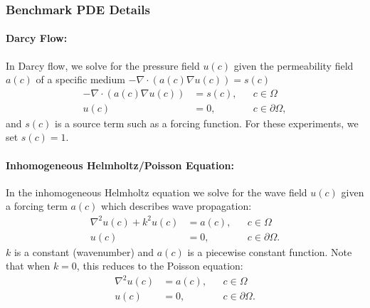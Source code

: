 \subsubsection{Benchmark PDE Details} \label{app:pde_details}

\paragraph{Darcy Flow: }
In Darcy flow, we solve for the pressure field $u(c)$ given the permeability field $a(c)$ of a specific medium $-\nabla \cdot (a(c)\nabla u(c)) = s(c)$ 
\begin{equation}
\begin{aligned}
 -\nabla \cdot (a(c)\nabla u(c)) &= s(c), &&c \in \Omega\\
 u(c) &= 0, &&c \in \partial \Omega ,
\end{aligned}
\label{eq:darcy}
\end{equation}
and $s(c)$ is a source term such as a forcing function. For these experiments, we set $s(c) = 1$. 

\paragraph{Inhomogeneous Helmholtz/Poisson Equation: }
In the inhomogeneous Helmholtz equation we solve for the wave field $u(c)$ given a forcing term $a(c)$ which describes wave propagation:
\begin{equation}
\begin{aligned}
\nabla^{2} u(c) + k^{2} u(c) &= a(c), &&c \in \Omega\\ 
u(c) &= 0, &&c \in \partial \Omega .
\end{aligned}
\label{eq:helmholtz}
\end{equation}
$k$ is a constant (wavenumber) and $a(c)$ is a piecewise constant function. Note that when $k = 0$, this reduces to the Poisson equation: 
\begin{equation}
\begin{aligned}
\nabla^{2} u(c) &= a(c), &&c \in \Omega\\ 
u(c) &= 0, &&c \in \partial \Omega .
\end{aligned}
\label{eq:poisson}
\end{equation}

